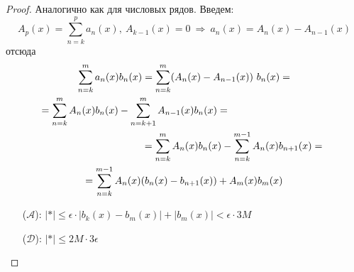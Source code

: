 \begin{proof} Аналогично как для числовых рядов. Введем:
    \[A_p(x)=\sum_{n=k}^{p}a_n(x),\ A_{k-1}(x)=0\ \Rightarrow\ a_n(x)=A_n(x)-A_{n-1}(x)\]
    отсюда
    \begin{multline*}
        \sum_{n=k}^{m}a_n(x)b_n(x)=\sum_{n=k}^{m}(A_n(x)-A_{n-1}(x))\ b_n(x)=\\
        =\sum_{n=k}^{m}A_n(x) b_n(x)-\sum_{n=k+1}^{m}A_{n-1}(x) b_n(x)=\tab[3.5cm]\\
        \tab[3.5cm]=\sum_{n=k}^{m}A_n(x) b_n(x)-\sum_{n=k}^{m-1}A_n(x) b_{n+1}(x)=\\
        =\sum_{n=k}^{m-1}A_n(x)(b_n(x)-b_{n+1}(x))+A_m(x) b_m(x)
    \end{multline*}
        \begin{itemize}
            \item[($\mathcal{A}$):] $|*|\leq \epsilon\cdot |b_{k}(x)-b_{m}(x)|+|b_m(x)|<\epsilon\cdot 3M$
            \item[($\mathcal{D}$):] $|*|\leq 2M\cdot 3\epsilon$
        \end{itemize}
\end{proof}